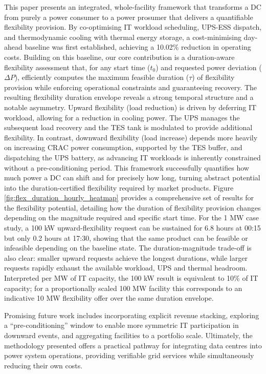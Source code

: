 \documentclass[lettersize,journal]{IEEEtran}
\newcommand{\rev}[1]{\textcolor{blue!70!black}{#1}}
\begin{document}
This paper presents an integrated, whole-facility framework that transforms a DC from purely a power consumer to a power prosumer that delivers a quantifiable flexibility provision. By co-optimising IT workload scheduling, UPS-ESS dispatch, and thermodynamic cooling with thermal energy storage, a cost-minimising day-ahead baseline was first established, achieving a 10.02\% reduction in operating costs. Building on this baseline, our core contribution is a duration-aware flexibility assessment that, for any start time ($t_0$) and requested power deviation ($\Delta P$), efficiently computes the maximum feasible duration ($\tau$) of flexibility provision while enforcing operational constraints and guaranteeing recovery. The resulting flexibility duration envelope reveals a strong temporal structure and a notable asymmetry. Upward flexibility (load reduction) is driven by deferring IT workload, allowing for a reduction in cooling power. The UPS manages the subsequent load recovery and the TES tank is modulated to provide additional flexibility. In contrast, downward flexibility (load increase) depends more heavily on increasing CRAC power consumption, supported by the TES buffer, and dispatching the UPS battery, as advancing IT workloads is inherently constrained without a pre-conditioning period. This framework successfully quantifies how much power a DC can shift and for precisely how long, turning abstract potential into the duration-certified flexibility required by market products. Figure \ref{fig:flex_duration_hourly_heatmap} provides a comprehensive set of results for the flexibility potential, detailing how the duration of flexibility provision changes depending on the magnitude required and specific start time. \rev{For the 1 MW case study, a 100 kW upward-flexibility request can be sustained for 6.8 hours at 00:15 but only 0.2 hours at 17:30, showing that the same product can be feasible or infeasible depending on the baseline state. The duration-magnitude trade-off is also clear: smaller upward requests achieve the longest durations, while larger requests rapidly exhaust the available workload, UPS and thermal headroom. Interpreted per MW of IT capacity, the 100 kW result is equivalent to 10\% of IT capacity; for a proportionally scaled 100 MW facility this corresponds to an indicative 10 MW flexibility offer over the same duration envelope.}

\rev{Promising future work includes incorporating explicit revenue stacking, exploring a ``pre-conditioning'' window to enable more symmetric IT participation in downward events, and aggregating facilities to a portfolio scale.} Ultimately, the methodology presented offers a practical pathway for integrating data centres into power system operations, providing verifiable grid services while simultaneously reducing their own costs.
\end{document}
